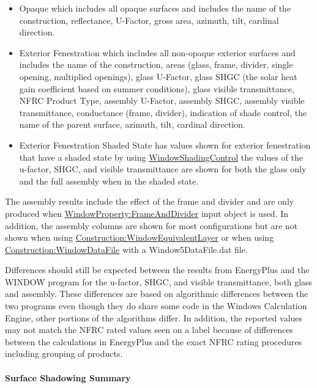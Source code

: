 \begin{itemize}
\item
  Opaque which includes all opaque surfaces and includes the name of the construction, reflectance, U-Factor, gross area, azimuth, tilt, cardinal direction.
\item
  Exterior Fenestration which includes all non-opaque exterior surfaces and includes the name of the construction, areas (glass, frame, divider, single opening, multiplied openings), glass U-Factor, glass SHGC (the solar heat gain coefficient based on summer conditions), glass visible transmittance, NFRC Product Type, assembly U-Factor, assembly SHGC, assembly visible transmittance, conductance (frame, divider), indication of shade control, the name of the parent surface, azimuth, tilt, cardinal direction. 
\item
  Exterior Fenestration Shaded State has values shown for exterior fenestration that have a shaded state by using \hyperref[windowpropertyshadingcontrol]{WindowShadingControl} the values of the u-factor, SHGC, and visible transmittance are shown for both the glass only and the full assembly when in the shaded state.
\end{itemize}

The assembly results include the effect of the frame and divider and are only produced when \hyperref[windowpropertyframeanddivider]{WindowProperty:FrameAndDivider} input object is used. In addition, the assembly columns are shown for most configurations but are not shown when using \hyperref[constructionwindowequivalentlayer]{Construction:WindowEquivalentLayer} or when using \hyperref[constructionwindowdatafile]{Construction:WindowDataFile} with a Window5DataFile.dat file. 

Differences should still be expected between the results from EnergyPlus and the WINDOW program for the u-factor, SHGC, and visible transmittance, both glass and assembly. These differences are based on algorithmic differences between the two programs even though they do share some code in the Windows Calculation Engine, other portions of the algorithms differ. In addition, the reported values may not match the NFRC rated values seen on a label because of differences between the calculations in EnergyPlus and the exact NFRC rating procedures including grouping of products.

\paragraph{Surface Shadowing Summary}\label{surface-shadowing-summary}

